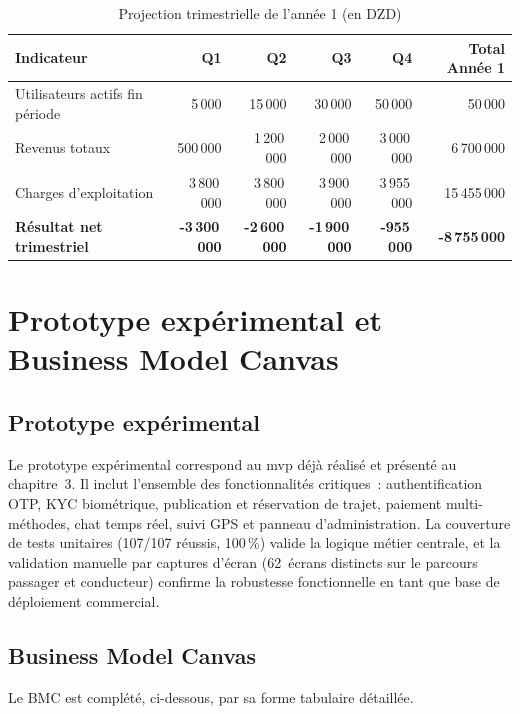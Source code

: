 \begin{table}[H]
\centering
\footnotesize
\begin{tabularx}{\textwidth}{|X|r|r|r|r|r|}
\hline
\rowcolor{rohlight}
\textbf{Indicateur} & \textbf{Q1} & \textbf{Q2} & \textbf{Q3} & \textbf{Q4} & \textbf{Total Année 1} \\
\hline
Utilisateurs actifs fin période & 5\,000 & 15\,000 & 30\,000 & 50\,000 & 50\,000 \\
\hline
Revenus totaux & 500\,000 & 1\,200\,000 & 2\,000\,000 & 3\,000\,000 & 6\,700\,000 \\
\hline
Charges d'exploitation & 3\,800\,000 & 3\,800\,000 & 3\,900\,000 & 3\,955\,000 & 15\,455\,000 \\
\hline
\rowcolor{rohlight!20}
\textbf{Résultat net trimestriel} & \textbf{-3\,300\,000} & \textbf{-2\,600\,000} & \textbf{-1\,900\,000} & \textbf{-955\,000} & \textbf{-8\,755\,000} \\
\hline
\end{tabularx}
  \caption{Projection trimestrielle de l'année 1 (en DZD)}
  \label{tab:trimestriel}
\end{table}

\section{Prototype expérimental et Business Model Canvas}

\subsection{Prototype expérimental}

Le prototype expérimental correspond au \gls{mvp} déjà réalisé et présenté au chapitre~3. Il inclut l'ensemble des fonctionnalités critiques~: authentification OTP, KYC biométrique, publication et réservation de trajet, paiement multi-méthodes, chat temps réel, suivi GPS et panneau d'administration. La couverture de tests unitaires (107/107 réussis, 100\,\%) valide la logique métier centrale, et la validation manuelle par captures d'écran (62~écrans distincts sur le parcours passager et conducteur) confirme la robustesse fonctionnelle en tant que base de déploiement commercial.

\subsection{Business Model Canvas}


Le BMC est complété, ci-dessous, par sa forme tabulaire détaillée.

